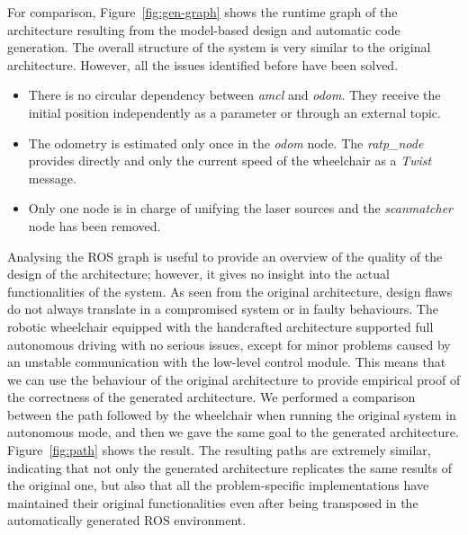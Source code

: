For comparison, Figure~\ref{fig:gen-graph} shows the runtime graph of the architecture resulting from the model-based design and automatic code generation. The overall structure of the system is very similar to the original architecture. However, all the issues identified before have been solved.
\begin{itemize}
\item There is no circular dependency between \textit{amcl} and \textit{odom}. They receive the initial position independently as a parameter or through an external topic.
\item The odometry is estimated only once in the \textit{odom} node. The \textit{ratp\_node} provides directly and only the current speed of the wheelchair as a \textit{Twist} message.
\item Only one node is in charge of unifying the laser sources and the \textit{scanmatcher} node has been removed.
\end{itemize}

Analysing the ROS graph is useful to provide an overview of the quality of the design of the architecture; however, it gives no insight into the actual functionalities of the system. As seen from the original architecture, design flaws do not always translate in a compromised system or in faulty behaviours. The robotic wheelchair equipped with the handcrafted architecture supported full autonomous driving with no serious issues, except for minor problems caused by an unstable communication with the low-level control module. This means that we can use the behaviour of the original architecture to provide empirical proof of the correctness of the generated architecture. We performed a comparison between the path followed by the wheelchair when running the original system in autonomous mode, and then we gave the same goal to the generated architecture. Figure~\ref{fig:path} shows the result. The resulting paths are extremely similar, indicating that not only the generated architecture replicates the same results of the original one, but also that all the problem-specific implementations have maintained their original functionalities even after being transposed in the automatically generated ROS environment.

